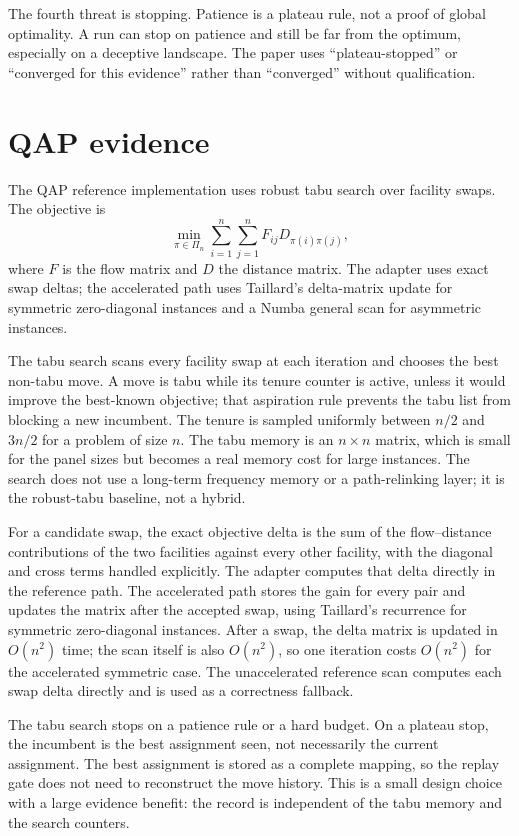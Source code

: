 \documentclass[11pt]{article}
\begin{document}
The fourth threat is stopping. Patience is a plateau rule, not a proof of global optimality. A run can
stop on patience and still be far from the optimum, especially on a deceptive landscape. The paper
uses “plateau-stopped” or “converged for this evidence” rather than “converged” without qualification.

\section{QAP evidence}
\label{sec:qap}

The QAP reference implementation uses robust tabu search over facility swaps. The objective is
\begin{equation}
\min_{\pi\in\Pi_n}\sum_{i=1}^{n}\sum_{j=1}^{n} F_{ij}D_{\pi(i)\pi(j)},
\end{equation}
where $F$ is the flow matrix and $D$ the distance matrix. The adapter uses exact swap deltas; the
accelerated path uses Taillard's delta-matrix update for symmetric zero-diagonal instances and a
Numba general scan for asymmetric instances.

The tabu search scans every facility swap at each iteration and chooses the best non-tabu move. A
move is tabu while its tenure counter is active, unless it would improve the best-known objective;
that aspiration rule prevents the tabu list from blocking a new incumbent. The tenure is sampled
uniformly between $n/2$ and $3n/2$ for a problem of size $n$. The tabu memory is an $n\times n$
matrix, which is small for the panel sizes but becomes a real memory cost for large instances. The
search does not use a long-term frequency memory or a path-relinking layer; it is the robust-tabu
baseline, not a hybrid.

For a candidate swap, the exact objective delta is the sum of the flow--distance contributions of the
two facilities against every other facility, with the diagonal and cross terms handled explicitly.
The adapter computes that delta directly in the reference path. The accelerated path stores the gain
for every pair and updates the matrix after the accepted swap, using Taillard's recurrence for
symmetric zero-diagonal instances. After a swap, the delta matrix is updated in $O(n^2)$ time; the
scan itself is also $O(n^2)$, so one iteration costs $O(n^2)$ for the accelerated symmetric case. The
unaccelerated reference scan computes each swap delta directly and is used as a correctness
fallback.

The tabu search stops on a patience rule or a hard budget. On a plateau stop, the incumbent is the
best assignment seen, not necessarily the current assignment. The best assignment is stored as a
complete mapping, so the replay gate does not need to reconstruct the move history. This is a small
design choice with a large evidence benefit: the record is independent of the tabu memory and the
search counters.
\end{document}
